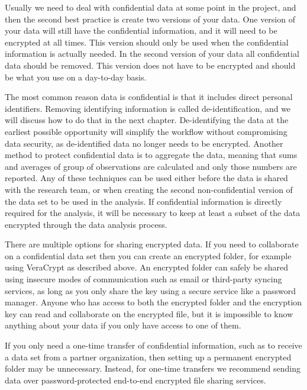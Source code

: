 Usually we need to deal with confidential data at some point in the project,
and then the second best practice is create two versions of your data.
One version of your data will still have the confidential information,
and it will need to be encrypted at all times.
This version should only be used
when the confidential information is actually needed.
In the second version of your data all confidential data should be removed.
This version does not have to be encrypted
and should be what you use on a day-to-day basis.

The most common reason data is confidential
is that it includes direct personal identifiers.
Removing identifying information is called de-identification,
and we will discuss how to do that in the next chapter.
De-identifying the data at the earliest possible opportunity
will simplify the workflow without compromising data security,
as de-identified data no longer needs to be encrypted.
Another method to protect confidential data is to aggregate the data,
meaning that sums and averages of group of observations are calculated
and only those numbers are reported.
Any of these techniques can be used either
before the data is shared with the research team,
or when creating the second non-confidential version
of the data set to be used in the analysis.
If confidential information is directly required for the analysis,
it will be necessary to keep at least a subset of the data
encrypted through the data analysis process.

There are multiple options for sharing encrypted data.
If you need to collaborate on a confidential data set
then you can create an encrypted folder,
for example using VeraCrypt as described above.
An encrypted folder can safely be shared using insecure modes of communication
such as email or third-party syncing services,
as long as you only share the key
using a secure service like a password manager.
Anyone who has access to both the encrypted folder and the encryption key
can read and collaborate on the encrypted file,
but it is impossible to know anything about your data
if you only have access to one of them.

If you only need a one-time transfer of confidential information,
such as to receive a data set from a partner organization,
then setting up a permanent encrypted folder may be unnecessary.
Instead, for one-time transfers we recommend sending data over password-protected
end-to-end encrypted file sharing services.

